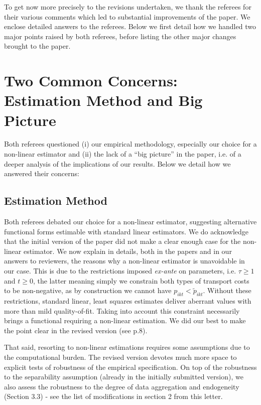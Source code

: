 \documentclass[12pt]{article}
\begin{document}
To get now more precisely to the revisions undertaken, we thank the referees for their various comments which led to substantial improvements of the paper. We enclose detailed answers to the referees. Below we first detail how we handled two major points raised by both referees, before listing the other major changes brought to the paper.

\section{Two Common Concerns: Estimation Method and Big Picture}
Both referees questioned (i) our empirical methodology, especially our choice for a non-linear estimator and (ii) the lack of a ``big picture'' in the paper, i.e. of a deeper analysis of the implications of our results. Below we detail how we answered their concerns:\medskip

\subsection{Estimation Method}
Both referees debated our choice for a non-linear estimator, suggesting alternative functional forms estimable with standard linear estimators. We do acknowledge that the initial version of the paper did not make a clear enough case for the non-linear estimator. We now explain in details, both in the papers and in our answers to reviewers, the reasons why a non-linear estimator is unavoidable in our case. This is due to the restrictions imposed \textit{ex-ante} on parameters, i.e. $\tau \geq 1$ and $t\geq 0$, the latter meaning simply we constrain both types of transport costs to be non-negative, as by construction we cannot have $p_{ikt} < \widetilde{p}_{ikt}$. Without these restrictions, standard linear, least squares estimates deliver aberrant values with more than mild quality-of-fit. Taking into account this constraint necessarily brings a functional requiring a non-linear estimation. We did our best to make the point clear in the revised version (see p.8). \medskip

That said, resorting to non-linear estimations requires some assumptions due to the computational burden. The revised version devotes much more space to explicit tests of robustness of the empirical specification. On top of the robustness to the separability assumption (already in the initially submitted version), we also assess the robustness to the degree of data aggregation and endogeneity (Section 3.3) - see the list of modifications in section 2 from this letter. \medskip
\end{document}
